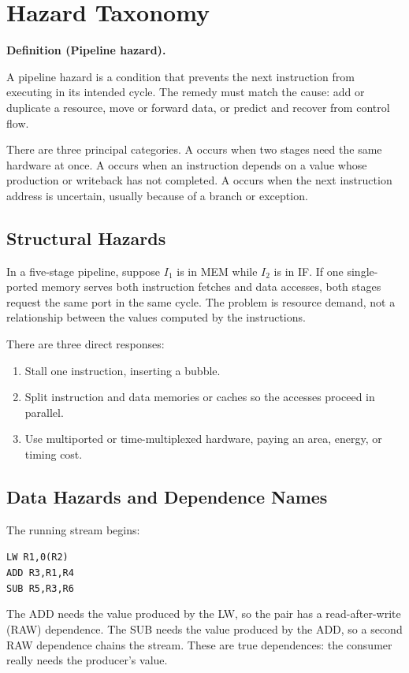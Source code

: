 \documentclass[11pt]{article}
\newenvironment{definitionbox}[1]{%
  \par\noindent\textbf{Definition (#1).}\ \itshape
}{\par\vspace{0.3em}}
\begin{document}
\section{Hazard Taxonomy}
\label{sec:hazards}

\begin{definitionbox}{Pipeline hazard}
A pipeline hazard is a condition that prevents the next instruction from
executing in its intended cycle. The remedy must match the cause: add or
duplicate a resource, move or forward data, or predict and recover from
control flow.
\end{definitionbox}

There are three principal categories. A  occurs when
two stages need the same hardware at once. A  occurs when an
instruction depends on a value whose production or writeback has not
completed. A  occurs when the next instruction address is
uncertain, usually because of a branch or exception.

\subsection{Structural Hazards}

In a five-stage pipeline, suppose $I_1$ is in MEM while $I_2$ is in IF. If one
single-ported memory serves both instruction fetches and data accesses, both
stages request the same port in the same cycle. The problem is resource
demand, not a relationship between the values computed by the instructions.

There are three direct responses:
\begin{enumerate}
  \item Stall one instruction, inserting a bubble.
  \item Split instruction and data memories or caches so the accesses proceed
        in parallel.
  \item Use multiported or time-multiplexed hardware, paying an area, energy,
        or timing cost.
\end{enumerate}

\subsection{Data Hazards and Dependence Names}

The running stream begins:
\begin{center}
\texttt{LW R1,0(R2)}\\
\texttt{ADD R3,R1,R4}\\
\texttt{SUB R5,R3,R6}
\end{center}
The ADD needs the value produced by the LW, so the pair has a read-after-write
(RAW) dependence. The SUB needs the value produced by the ADD, so a second RAW
dependence chains the stream. These are true dependences: the consumer really
needs the producer's value.
\end{document}
